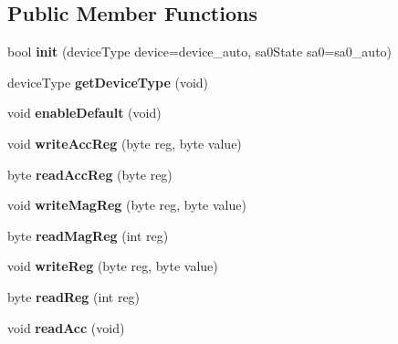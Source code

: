 \subsection*{Public Member Functions}
\begin{DoxyCompactItemize}
\item 
\mbox{\label{class_l_s_m303_a123959c3c9fc7ea31083843c0db286c0}} 
bool {\bfseries init} (device\+Type device=device\+\_\+auto, sa0\+State sa0=sa0\+\_\+auto)
\item 
\mbox{\label{class_l_s_m303_a75ba91833135a3d2b242a28bbd38b60d}} 
device\+Type {\bfseries get\+Device\+Type} (void)
\item 
\mbox{\label{class_l_s_m303_a253992f24eb62d618c740c00f9604619}} 
void {\bfseries enable\+Default} (void)
\item 
\mbox{\label{class_l_s_m303_aa381bad81ac2b1c844a310c31c55851d}} 
void {\bfseries write\+Acc\+Reg} (byte reg, byte value)
\item 
\mbox{\label{class_l_s_m303_a25e8e01561d1ecd6e126ecf00a4098d3}} 
byte {\bfseries read\+Acc\+Reg} (byte reg)
\item 
\mbox{\label{class_l_s_m303_a470fa63cc2571442d0dcd9f9613482ac}} 
void {\bfseries write\+Mag\+Reg} (byte reg, byte value)
\item 
\mbox{\label{class_l_s_m303_a35172bd35bac593d0db127d4da1ef2d9}} 
byte {\bfseries read\+Mag\+Reg} (int reg)
\item 
\mbox{\label{class_l_s_m303_a37813b3ab37b06d57926fe41e31a0fb3}} 
void {\bfseries write\+Reg} (byte reg, byte value)
\item 
\mbox{\label{class_l_s_m303_a3866d19f8996011378b4832805ee5fc4}} 
byte {\bfseries read\+Reg} (int reg)
\item 
\mbox{\label{class_l_s_m303_ac1396a51b288eadc41fd19fbd79ef68e}} 
void {\bfseries read\+Acc} (void)
\item 
\mbox{\label{class_l_s_m303_abc93e8d8101c6b00df2ae85c5f8ded9e}} 

\end{DoxyCompactItemize}
